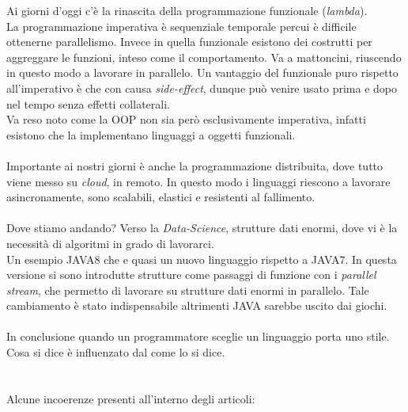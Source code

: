\documentclass[10pt,a4paper]{book}
\begin{document}
Ai giorni d'oggi c'\`e la rinascita della programmazione funzionale (\textit{lambda}).\\
La programmazione imperativa \`e sequenziale temporale percui \`e difficile ottenerne parallelismo. Invece in quella funzionale esistono dei costrutti per aggreggare le funzioni, inteso come il comportamento. Va a mattoncini, riuscendo in questo modo a lavorare in parallelo. Un vantaggio del funzionale puro rispetto all'imperativo \`e che con causa \textit{side-effect}, dunque pu\`o venire usato prima e dopo nel tempo senza effetti collaterali.\\
Va reso noto come la OOP non sia per\`o esclusivamente imperativa, infatti esistono che la implementano linguaggi a oggetti funzionali.\\\\
Importante ai nostri giorni \`e anche la programmazione distribuita, dove tutto viene messo su \textit{cloud}, in remoto. In questo modo i linguaggi riescono a lavorare asincronamente, sono scalabili, elastici e resistenti al fallimento.\\\\
Dove stiamo andando? Verso la \textit{Data-Science}, strutture dati enormi, dove vi \`e la necessit\`a di algoritmi in grado di lavorarci.\\
Un esempio JAVA8 che e quasi un nuovo linguaggio rispetto a JAVA7.  In questa versione si sono introdutte strutture come passaggi di funzione con i \textit{parallel stream}, che permetto di lavorare su strutture dati enormi in parallelo. Tale cambiamento \`e stato indispensabile altrimenti JAVA sarebbe uscito dai giochi.\\\\
In conclusione quando un programmatore sceglie un linguaggio porta uno stile. Cosa si dice \`e influenzato dal come lo si dice.
\\\\\\
Alcune incoerenze presenti all'interno degli articoli:
\end{document}
